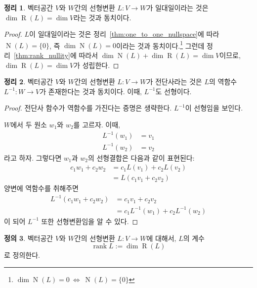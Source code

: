 \documentclass[unfonts,oneside,a4paper]{oblivoir}
\theoremstyle{definition}
\newtheorem{definition}{정의}[section]
\theoremstyle{theorem}
\newtheorem{theorem}[definition]{정리}
\theoremstyle{theorem}
\theoremstyle{remark}
\theoremstyle{remark}
\theoremstyle{remark}
\theoremstyle{remark}
\renewcommand{\vec}[1]{\bm{\mathit{#1}}}
\newcommand{\vecz}{\bm{\mathrm{0}}}
\DeclareMathOperator{\Null}{N}
\DeclareMathOperator{\Range}{R}
\DeclareMathOperator{\rank}{rank}
\begin{document}
\begin{theorem} \label{thm:one_to_one_range}
    벡터공간 $V$와 $W$간의 선형변환 $L: V \rightarrow W$가 일대일이라는 것은 $\dim \Range (L) = \dim V$라는 것과 동치이다.
\end{theorem}

\begin{proof}
    $L$이 일대일이라는 것은 정리~\ref{thm:one_to_one_nullspace}에 따라 $\Null (L) = \{\vecz\}$, 즉 $\dim \Null (L) = 0$이라는 것과 동치이다.\footnote{$\dim \Null (L) = 0\ \Leftrightarrow\ \Null (L) = \{\vecz\}$}
    그런데 정리~\ref{thm:rank_nullity}에 따라서 $\dim \Null (L) + \dim \Range (L) = \dim V$이므로, $\dim \Range(L) = \dim V$가 성립한다.
\end{proof}

\begin{theorem} \label{thm:inverse}
    벡터공간 $V$와 $W$간의 선형변환 $L: V \rightarrow W$가 전단사라는 것은 $L$의 역함수 $L^{-1}: W \rightarrow V$가 존재한다는 것과 동치이다.
    이때, $L^{-1}$도 선형이다.
\end{theorem}

\begin{proof}
    전단사 함수가 역함수를 가진다는 증명은 생략한다.
    $L^{-1}$이 선형임을 보인다.

    $W$에서 두 원소 $\vec w_1$와 $\vec w_2$를 고르자.
    이때,
    \begin{align*}
        L^{-1}(\vec w_1) &= \vec v_1\\
        L^{-1}(\vec w_2) &= \vec v_2
    \end{align*}
    라고 하자.
    그렇다면 $\vec w_1$과 $\vec w_2$의 선형결합은 다음과 같이 표현된다:
    \begin{align*}
        c_1 \vec w_1 + c_2 \vec w_2 &= c_1 L(\vec v_1) + c_2 L(\vec v_2)\\
                                &= L(c_1 \vec v_1 + c_2 \vec v_2)
    \end{align*}
    양변에 역함수를 취해주면
    \begin{align*}
        L^{-1}(c_1 \vec w_1 + c_2 \vec w_2) &= c_1 \vec v_1 + c_2 \vec v_2\\
                                     &= c_1 L^{-1}(\vec w_1) + c_2 L^{-1}(\vec w_2)
    \end{align*}
    이 되어 $L^{-1}$ 또한 선형변환임을 알 수 있다.
\end{proof}

\begin{definition}
    벡터공간 $V$와 $W$간의 선형변환 $L: V \rightarrow W$에 대해서, $L$의 계수
    \begin{equation*}
        \rank L := \dim \Range(L)
    \end{equation*}
    로 정의한다.
\end{definition}
\end{document}
